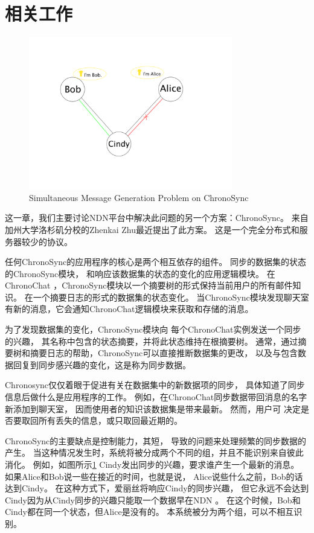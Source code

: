 \documentclass[a4paper]{article}
\begin{document}
\section{相关工作}

\begin{figure}[!t]
\centering
\includegraphics[width=3.5in]{../png/simultaneous.png}
\caption{Simultaneous Message Generation Problem on ChronoSync}
\label{simultaneous}
\end{figure}

这一章，我们主要讨论NDN平台中解决此问题的另一个方案：ChronoSync。
来自加州大学洛杉矶分校的Zhenkai Zhu最近提出了此方案。
这是一个完全分布式和服务器较少的协议。

任何ChronoSync的应用程序的核心是两个相互依存的组件。
同步的数据集的状态的ChronoSync模块，
和响应该数据集的状态的变化的应用逻辑模块。
在ChronoChat ，ChronoSync模块以一个摘要树的形式保持当前用户的所有邮件知识。
在一个摘要日志的形式的数据集的状态变化。
当ChronoSync模块发现聊天室有新的消息，它会通知ChronoChat逻辑模块来获取和存储的消息。

为了发现数据集的变化，ChronoSync模块向
每个ChronoChat实例发送一个同步的兴趣，
其名称中包含的状态摘要，并将此状态维持在根摘要树。
通常，通过摘要树和摘要日志的帮助，ChronoSync可以直接推断数据集的更改，
以及与包含数据回复到同步感兴趣的变化，这是称为同步数据。

Chronosync仅仅着眼于促进有关在数据集中的新数据项的同步，
具体知道了同步信息后做什么是应用程序的工作。
例如，在ChronoChat同步数据带回消息的名字新添加到聊天室，
因而使用者的知识该数据集是带来最新。
然而，用户可 决定是否要取回所有丢失的信息，或只取回最近期的。

ChronoSync的主要缺点是控制能力，其短，
导致的问题来处理频繁的同步数据的产生。
当这种情况发生时，系统将被分成两个不同的组，并且不能识别来自彼此消化。
例如，如图所示\ref{simultaneous}
Cindy发出同步的兴趣，要求谁产生一个最新的消息。
如果Alice和Bob说一些在接近的时间，也就是说，
Alice说些什么之前，Bob的话达到Cindy。
在这种方式下，爱丽丝将响应Cindy的同步兴趣，
但它永远不会达到Cindy因为从Cindy同步的兴趣只能取一个数据早在NDN 。
在这个时候，Bob和Cindy都在同一个状态，但Alice是没有的。
本系统被分为两个组，可以不相互识别。
\end{document}
